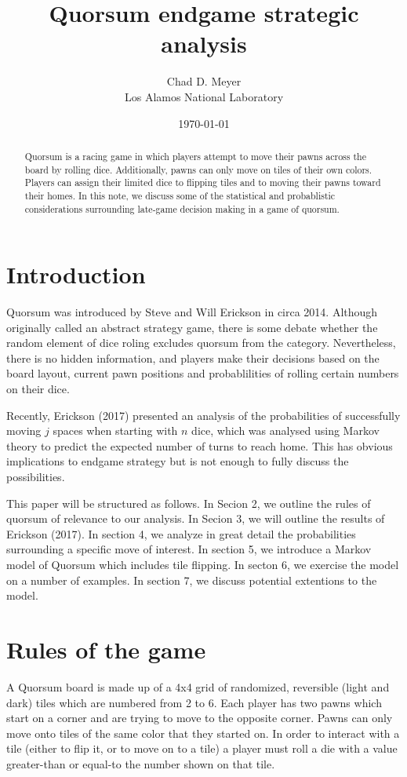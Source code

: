\documentclass[letterpaper]{article}
\begin{document}
\title{Quorsum endgame strategic analysis}
\author{Chad D. Meyer \\ Los Alamos National Laboratory}
\date{\today}
\maketitle

\begin{abstract}
Quorsum is a racing game in which players attempt to move their pawns across
the board by rolling dice.  Additionally, pawns can only move on tiles of
their own colors.  Players can assign their limited dice to flipping tiles
and to moving their pawns toward their homes.  In this note, we discuss some
of the statistical and probablistic considerations surrounding late-game
decision making in a game of quorsum.
\end{abstract}

\section{Introduction}
Quorsum was introduced by Steve and Will Erickson in circa 2014.  Although
originally called an abstract strategy game, there is some debate whether the
random element of dice roling excludes quorsum from the category.  Nevertheless,
there is no hidden information, and players make their decisions based on the
board layout, current pawn positions and probablilities of rolling certain
numbers on their dice.

Recently, Erickson (2017) presented an analysis of the probabilities of
successfully moving $j$ spaces when starting with $n$ dice, which was analysed
using Markov theory to predict the expected number of turns to reach home.  This
has obvious implications to endgame strategy but is not enough to fully discuss
the possibilities.

This paper will be structured as follows.  In Secion 2, we outline the rules of
quorsum of relevance to our analysis.  In Secion 3, we will outline the results
of Erickson (2017).  In section 4, we analyze in great detail the probabilities
surrounding a specific move of interest.  In section 5, we introduce a Markov
model of Quorsum which includes tile flipping.  In secton 6, we exercise the
model on a number of examples.  In section 7, we discuss potential extentions
to the model.

\section{Rules of the game}
A Quorsum board is made up of a 4x4 grid of randomized, reversible (light and
dark) tiles which are numbered from 2 to 6.  Each player has two pawns which
start on a corner and are trying to move to the opposite corner.  Pawns can only
move onto tiles of the same color that they started on.  In order to
interact with a tile (either to flip it, or to move on to a tile) a player must
roll a die with a value greater-than or equal-to the number shown on that tile.
\end{document}
